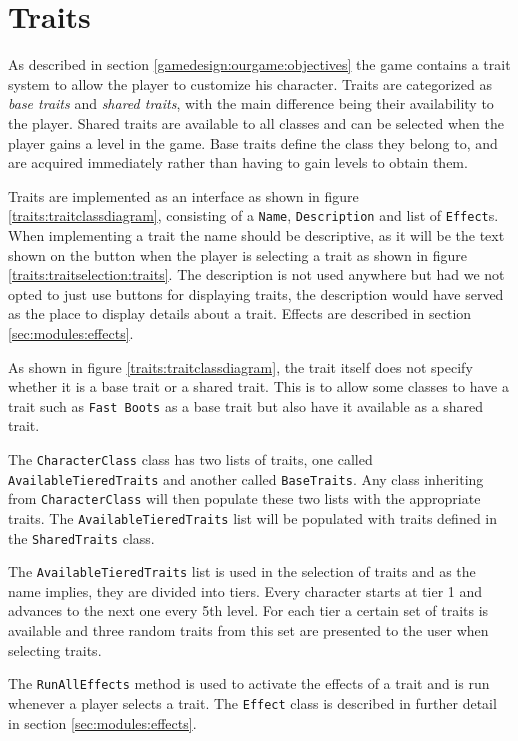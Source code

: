 \section{Traits}
\label{sec:modules:traits}

As described in section \ref{gamedesign:ourgame:objectives} the game contains a trait system to allow the player to customize his character.
Traits are categorized as \textit{base traits} and \textit{shared traits}, with the main difference being their availability to the player.
Shared traits are available to all classes and can be selected when the player gains a level in the game.
Base traits define the class they belong to, and are acquired immediately rather than having to gain levels to obtain them.

Traits are implemented as an interface as shown in figure \ref{traits:traitclassdiagram}, consisting of a \texttt{Name}, \texttt{Description} and list of \texttt{Effect}s.
When implementing a trait the name should be descriptive, as it will be the text shown on the button when the player is selecting a trait as shown in figure \ref{traits:traitselection:traits}. 
The description is not used anywhere but had we not opted to just use buttons for displaying traits, the description would have served as the place to display details about a trait.
Effects are described in section \ref{sec:modules:effects}.

As shown in figure \ref{traits:traitclassdiagram}, the trait itself does not specify whether it is a base trait or a shared trait.
This is to allow some classes to have a trait such as \texttt{Fast Boots} as a base trait but also have it available as a shared trait.

The \texttt{CharacterClass} class has two lists of traits, one called \texttt{AvailableTieredTraits} and another called \texttt{BaseTraits}.
Any class inheriting from \texttt{CharacterClass} will then populate these two lists with the appropriate traits.
The \texttt{AvailableTieredTraits} list will be populated with traits defined in the \texttt{SharedTraits} class.

The \texttt{AvailableTieredTraits} list is used in the selection of traits and as the name implies, they are divided into tiers.
Every character starts at tier 1 and advances to the next one every 5th level.
For each tier a certain set of traits is available and three random traits from this set are presented to the user when selecting traits.

The \texttt{RunAllEffects} method is used to activate the effects of a trait and is run whenever a player selects a trait.
The \texttt{Effect} class is described in further detail in section \ref{sec:modules:effects}.

